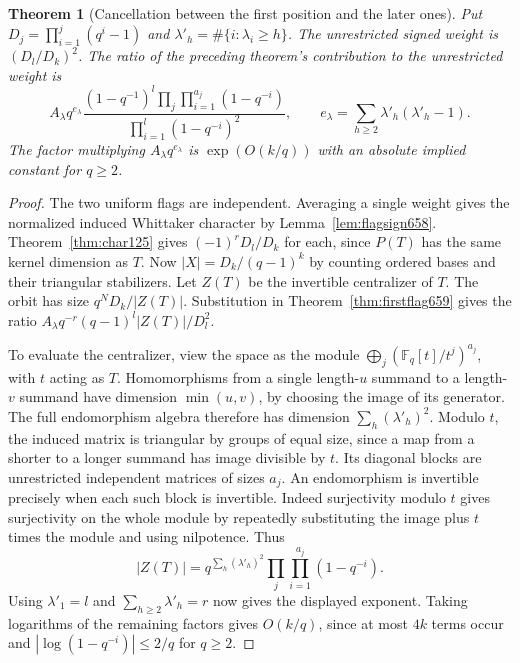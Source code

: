 \documentclass[a4paper,11pt]{article}
\newtheorem{theorem}[proposition]{Theorem}
\theoremstyle{definition}
\theoremstyle{remark}
\numberwithin{equation}{section}
\begin{document}
\begin{theorem}[Cancellation between the first position and the later ones]
\leavevmode\label{thm:flagcancel659}
Put \(D_j=\prod_{i=1}^j(q^i-1)\) and
\(\lambda'_h=\#\{i:\lambda_i\ge h\}\).
The unrestricted signed weight is \((D_l/D_k)^2\).
The ratio of the preceding theorem's contribution to the
unrestricted weight is
\[
 A_\lambda q^{e_\lambda}
 \frac{(1-q^{-1})^l
       \prod_j\prod_{i=1}^{a_j}(1-q^{-i})}
      {\prod_{i=1}^{l}(1-q^{-i})^2},\qquad
 e_\lambda=\sum_{h\ge2}\lambda'_h(\lambda'_h-1).
\]
The factor multiplying \(A_\lambda q^{e_\lambda}\) is
\(\exp(O(k/q))\) with an absolute implied constant for \(q\ge2\).
\end{theorem}
\begin{proof}
The two uniform flags are independent. Averaging a single weight
gives the normalized induced Whittaker character by
Lemma~\ref{lem:flagsign658}. Theorem~\ref{thm:char125} gives
\((-1)^r D_l/D_k\) for each, since \(P(T)\) has the same kernel
dimension as \(T\). Now \(|X|=D_k/(q-1)^k\) by counting ordered
bases and their triangular stabilizers. Let \(Z(T)\) be the
invertible centralizer of \(T\). The orbit has size
\(q^N D_k/|Z(T)|\). Substitution in Theorem~\ref{thm:firstflag659}
gives the ratio \(A_\lambda q^{-r}(q-1)^l|Z(T)|/D_l^2\).

To evaluate the centralizer, view the space as the module
\(\bigoplus_j(\mathbb F_q[t]/t^j)^{a_j}\), with \(t\) acting
as \(T\). Homomorphisms from a single length-\(u\) summand to a
length-\(v\) summand have dimension \(\min(u,v)\), by choosing
the image of its generator. The full endomorphism algebra
therefore has dimension \(\sum_h(\lambda'_h)^2\).
Modulo \(t\), the induced matrix is triangular by groups of
equal size, since a map from a shorter to a longer summand has
image divisible by \(t\). Its diagonal blocks are unrestricted
independent matrices of sizes \(a_j\). An endomorphism is
invertible precisely when each such block is invertible. Indeed
surjectivity modulo \(t\) gives surjectivity on the whole module
by repeatedly substituting the image plus \(t\) times the module
and using nilpotence. Thus
\[
 |Z(T)|=q^{\sum_h(\lambda'_h)^2}
                     \prod_j\prod_{i=1}^{a_j}(1-q^{-i}).
\]
Using \(\lambda'_1=l\) and \(\sum_{h\ge2}\lambda'_h=r\)
now gives the displayed exponent. Taking logarithms of the
remaining factors gives \(O(k/q)\), since at most \(4k\)
terms occur and \(|\log(1-q^{-i})|\le2/q\) for \(q\ge2\).
\end{proof}
\end{document}
